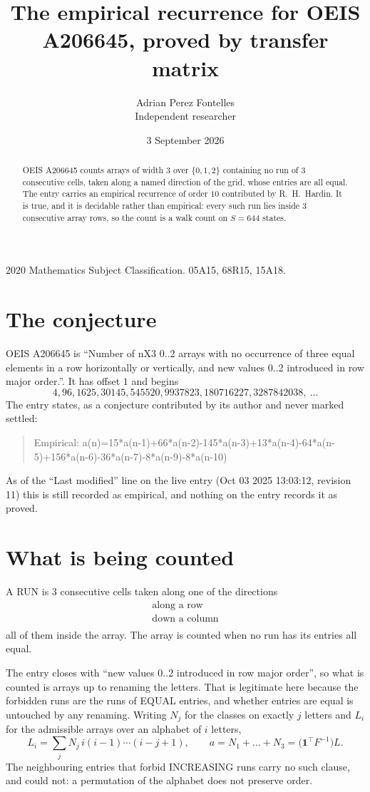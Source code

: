 \documentclass[11pt,a4paper]{article}
\title{The empirical recurrence for OEIS A206645, proved by transfer matrix}
\author{Adrian Perez Fontelles\\ \small Independent researcher}
\date{3 September 2026}
\theoremstyle{plain}
\theoremstyle{definition}
\begin{document}
\maketitle

\begin{abstract}
OEIS A206645 counts arrays of width $3$ over $\{0,1,2\}$ containing no run of $3$ consecutive
cells, taken along a named direction of the grid, whose entries are all equal. The entry carries
an empirical recurrence of order $10$ contributed by R.~H.~Hardin. It is true, and it is
decidable rather than empirical: every such run lies inside $3$ consecutive array rows, so
the count is a walk count on $S=644$ states.
\end{abstract}

\noindent\small 2020 Mathematics Subject Classification. 05A15, 68R15, 15A18.\normalsize

\section{The conjecture}

OEIS A206645 is ``Number of nX3 0..2 arrays with no occurrence of three equal elements in a row horizontally or vertically, and new values 0..2 introduced in row major order.''. It has offset $1$ and begins
\[
4, 96, 1625, 30145, 545520, 9937823, 180716227, 3287842038,\ \dots
\]
The entry states, as a conjecture contributed by its author and never marked settled:
\begin{quote}
Empirical: a(n)=15*a(n-1)+66*a(n-2)-145*a(n-3)+13*a(n-4)-64*a(n-5)+156*a(n-6)-36*a(n-7)-8*a(n-9)-8*a(n-10)
\end{quote}
As of the ``Last modified'' line on the live entry (Oct 03 2025 13:03:12, revision 11) this is still
recorded as empirical, and nothing on the entry records it as proved.

\section{What is being counted}

A RUN is $3$ consecutive cells taken along one of the directions
\[
\begin{array}{l}
\text{along a row} \\
\text{down a column} \\
\end{array}
\]
all of them inside the array. The array is counted when no run has its entries all equal.


The entry closes with ``new values $0..2$ introduced in row major order'', so what is counted
is arrays up to renaming the letters. That is legitimate here because the forbidden runs are
the runs of EQUAL entries, and whether entries are equal is untouched by any renaming. Writing
$N_j$ for the classes on exactly $j$ letters and $L_i$ for the admissible arrays over an
alphabet of $i$ letters,
\[
L_i=\sum_j N_j\,i(i-1)\cdots(i-j+1),\qquad
a=N_1+\dots+N_{3}=\bigl(\mathbf{1}^{\!\top}F^{-1}\bigr)L .
\]
The neighbouring entries that forbid INCREASING runs carry no such clause, and could not: a
permutation of the alphabet does not preserve order.
\end{document}
